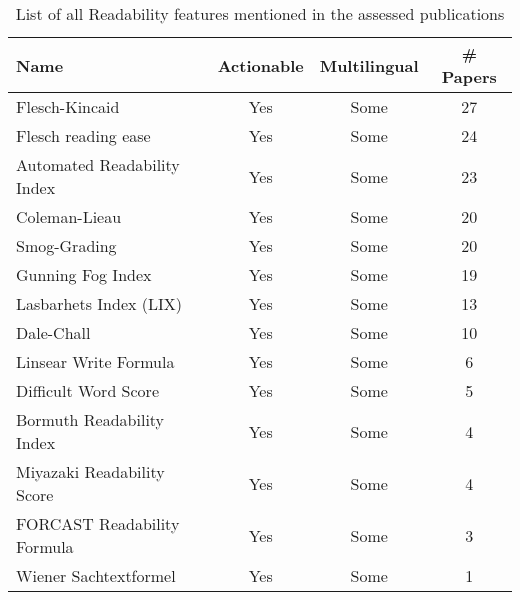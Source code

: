 \begin{table}[htbp]
    \caption{List of all Readability features mentioned in the assessed publications}
    \label{tab:feat_Readability}
    \centering
    \begin{tabular}{m{} c c c}
        \toprule
        \textbf{Name} & \textbf{Actionable} & \textbf{Multilingual} & \textbf{\# Papers} \\ 
        \midrule
        Flesch-Kincaid & Yes & Some & 27 \\
        Flesch reading ease & Yes & Some & 24 \\
        Automated Readability Index & Yes & Some & 23 \\
        Coleman-Lieau & Yes & Some & 20 \\
        Smog-Grading & Yes & Some & 20 \\
        Gunning Fog Index & Yes & Some & 19 \\
        Lasbarhets Index (LIX) & Yes & Some & 13 \\
        Dale-Chall & Yes & Some & 10 \\
        Linsear Write Formula & Yes & Some & 6 \\
        Difficult Word Score & Yes & Some & 5 \\
        Bormuth Readability Index & Yes & Some & 4 \\
        Miyazaki Readability Score & Yes & Some & 4 \\
        FORCAST Readability Formula & Yes & Some & 3 \\
        Wiener Sachtextformel & Yes & Some & 1 \\
        \bottomrule
    \end{tabular}
\end{table}